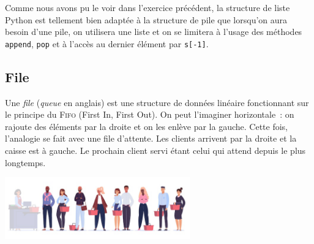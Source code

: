\documentclass{magnolia}
\begin{document}
\vspace{2ex}
Comme nous avons pu le voir dans l'exercice précédent, la structure de liste Python
est tellement bien adaptée à la structure de pile que lorsqu'on aura besoin d'une pile, on utilisera une
liste et on se limitera à l'usage des méthodes \verb!append!, \verb!pop! et à l'accès au dernier élément
par \verb!s[-1]!.


\subsection{File}

Une \emph{file} (\emph{queue} en anglais) est une structure de données linéaire fonctionnant
sur le principe du \textsc{Fifo} (First
In, First Out). On peut l'imaginer horizontale~: on rajoute des éléments par la droite
et on les enlève par la gauche. Cette fois, l'analogie se fait avec une file
d'attente. Les clients arrivent par la droite et la caisse est à gauche. Le prochain client
servi étant celui qui attend depuis le plus longtemps.

\begin{center}
  \includegraphics[width=0.6\textwidth]{../../Commun/Images/python-cours-file}
  \end{center}




\end{document}
